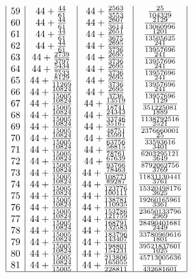 \documentclass{amsart}
\begin{document}
$$\begin{array}{|c|c|c|c|}
59&44+\frac{44}{61}&44+\frac{2563}{3553}&\frac{25}{104329}\\
60&44+\frac{44}{61}&44+\frac{2607}{3614}&\frac{2129}{13060996}\\
61&44+\frac{44}{61}&44+\frac{2651}{3675}&\frac{1201}{13505625}\\
62&44+\frac{44}{61}&44+\frac{2695}{3736}&\frac{241}{13957696}\\
63&44+\frac{2739}{3797}&44+\frac{2695}{3736}&\frac{241}{13957696}\\
64&44+\frac{5434}{7533}&44+\frac{2695}{3736}&\frac{241}{13957696}\\
65&44+\frac{8129}{11269}&44+\frac{2695}{3736}&\frac{241}{13957696}\\
66&44+\frac{10824}{15005}&44+\frac{2695}{3736}&\frac{241}{13957696}\\
67&44+\frac{10824}{15005}&44+\frac{13519}{18741}&\frac{1129}{351225081}\\
68&44+\frac{10824}{15005}&44+\frac{24343}{33746}&\frac{1889}{1138792516}\\
69&44+\frac{10824}{15005}&44+\frac{35167}{48751}&\frac{2521}{2376660001}\\
70&44+\frac{10824}{15005}&44+\frac{45991}{63756}&\frac{25}{33593616}\\
71&44+\frac{10824}{15005}&44+\frac{56815}{78761}&\frac{3401}{6203295121}\\
72&44+\frac{10824}{15005}&44+\frac{67639}{93766}&\frac{3649}{8792062756}\\
73&44+\frac{10824}{15005}&44+\frac{78463}{108771}&\frac{3769}{11831130441}\\
74&44+\frac{10824}{15005}&44+\frac{89287}{123776}&\frac{3761}{15320498176}\\
75&44+\frac{10824}{15005}&44+\frac{100111}{138781}&\frac{3625}{19260165961}\\
76&44+\frac{10824}{15005}&44+\frac{110935}{153786}&\frac{3361}{23650133796}\\
77&44+\frac{10824}{15005}&44+\frac{121759}{168791}&\frac{2969}{28490401681}\\
78&44+\frac{10824}{15005}&44+\frac{132583}{183796}&\frac{2449}{33780969616}\\
79&44+\frac{10824}{15005}&44+\frac{143407}{198801}&\frac{1801}{39521837601}\\
80&44+\frac{10824}{15005}&44+\frac{154231}{213806}&\frac{1025}{45713005636}\\
81&44+\frac{10824}{15005}&44+\frac{165055}{228811}&\frac{1}{432681601}\\
 \hline
\end{array}$$
\end{document}
